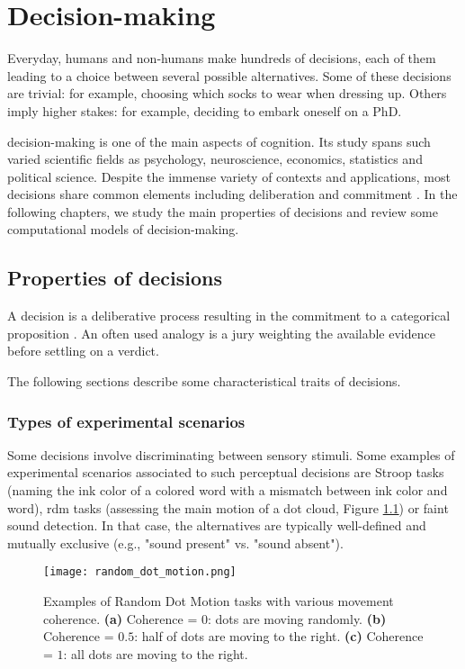 \chapter{Decision-making}

Everyday, humans and non-humans make hundreds of \glspl{decision}, each of them leading to a \gls{choice} between several possible alternatives. Some of these decisions are trivial: for example, choosing which socks to wear when dressing up. Others imply higher stakes: for example, deciding to embark oneself on a PhD.

\Gls{decision-making} is one of the main aspects of cognition. Its study spans such varied scientific fields as psychology, neuroscience, economics, statistics and political science. Despite the immense variety of contexts and applications, most decisions share common elements including deliberation and commitment \cite{goldNeuralBasisDecision2007}. In the following chapters, we study the main properties of decisions and review some computational models of decision-making.

\section{Properties of decisions}

A decision is a deliberative process resulting in the commitment to a categorical proposition \cite{goldNeuralBasisDecision2007}. An often used analogy is a jury weighting the available evidence before settling on a verdict.

The following sections describe some characteristical traits of decisions.

\subsection{Types of experimental scenarios}

Some decisions involve discriminating between sensory stimuli. Some examples of experimental scenarios associated to such perceptual decisions are Stroop tasks (naming the ink color of a colored word with a mismatch between ink color and word), \acrlong{rdm} tasks (assessing the main motion of a dot cloud, Figure \ref{figure:rdm}) or faint sound detection. In that case, the alternatives are typically well-defined and mutually exclusive (e.g., "sound present" vs. "sound absent").

\begin{figure}[ht]
    \centering
    \texttt{[image: random\_dot\_motion.png]}
    \caption[Examples of Random Dot Motion tasks]{Examples of Random Dot Motion tasks with various movement coherence. \textbf{(a)} Coherence = $0$: dots are moving randomly. \textbf{(b)} Coherence = $0.5$: half of dots are moving to the right. \textbf{(c)} Coherence = $1$: all dots are moving to the right.}
    \label{figure:rdm}
\end{figure}

